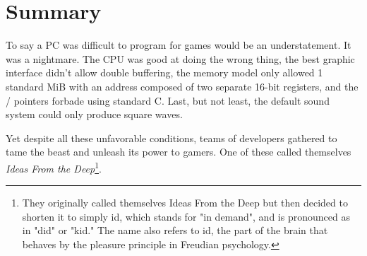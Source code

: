 \documentclass[book.tex]{subfiles}
\begin{document}
\section{Summary}
To say a PC was difficult to program for games would be an understatement. It was a nightmare. The CPU was good at doing the wrong thing, the best graphic interface didn't allow double buffering, the memory model only allowed 1 standard MiB with an address composed of two separate 16-bit registers, and the / pointers forbade using standard C. Last, but not least, the default sound system could only produce square waves.\\
\par
Yet despite all these unfavorable conditions, teams of developers gathered to tame the beast and unleash its power to gamers. One of these called themselves \textit{Ideas From the Deep}\footnote{They originally called themselves Ideas From the Deep but then decided to shorten it to simply id, which stands for "in demand", and is pronounced as in "did" or "kid." The name also refers to id, the part of the brain that behaves by the pleasure principle in Freudian psychology.}.
\end{document}

